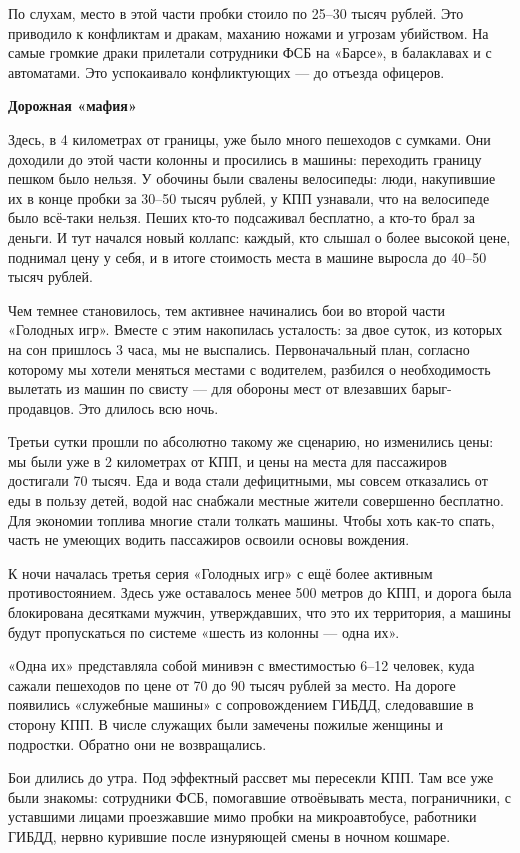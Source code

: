 По слухам, место в этой части пробки стоило по 25–30 тысяч рублей. Это приводило к конфликтам и дракам, маханию ножами и угрозам убийством. На самые громкие драки прилетали сотрудники ФСБ на «Барсе», в балаклавах и с автоматами. Это успокаивало конфликтующих — до отъезда офицеров.


\textbf{Дорожная «мафия»}

Здесь, в 4 километрах от границы, уже было много пешеходов с сумками. Они доходили до этой части колонны и просились в машины: переходить границу пешком было нельзя. У обочины были свалены велосипеды: люди, накупившие их в конце пробки за 30–50 тысяч рублей, у КПП узнавали, что на велосипеде было всё-таки нельзя. Пеших кто-то подсаживал бесплатно, а кто-то брал за деньги. И тут начался новый коллапс: каждый, кто слышал о более высокой цене, поднимал цену у себя, и в итоге стоимость места в машине выросла до 40–50 тысяч рублей.

Чем темнее становилось, тем активнее начинались бои во второй части «Голодных игр». Вместе с этим накопилась усталость: за двое суток, из которых на сон пришлось 3 часа, мы не выспались. Первоначальный план, согласно которому мы хотели меняться местами с водителем, разбился о необходимость вылетать из машин по свисту — для обороны мест от влезавших барыг-продавцов. Это длилось всю ночь.

Третьи сутки прошли по абсолютно такому же сценарию, но изменились цены: мы были уже в 2 километрах от КПП, и цены на места для пассажиров достигали 70 тысяч. Еда и вода стали дефицитными, мы совсем отказались от еды в пользу детей, водой нас снабжали местные жители совершенно бесплатно. Для экономии топлива многие стали толкать машины. Чтобы хоть как-то спать, часть не умеющих водить пассажиров освоили основы вождения.

К ночи началась третья серия «Голодных игр» с ещё более активным противостоянием. Здесь уже оставалось менее 500 метров до КПП, и дорога была блокирована десятками мужчин, утверждавших, что это их территория, а машины будут пропускаться по системе «шесть из колонны — одна их».


«Одна их» представляла собой минивэн с вместимостью 6–12 человек, куда сажали пешеходов по цене от 70 до 90 тысяч рублей за место. На дороге появились «служебные машины» с сопровождением ГИБДД, следовавшие в сторону КПП. В числе служащих были замечены пожилые женщины и подростки. Обратно они не возвращались.

Бои длились до утра. Под эффектный рассвет мы пересекли КПП. Там все уже были знакомы: сотрудники ФСБ, помогавшие отвоёвывать места, пограничники, с уставшими лицами проезжавшие мимо пробки на микроавтобусе, работники ГИБДД, нервно курившие после изнуряющей смены в ночном кошмаре.

